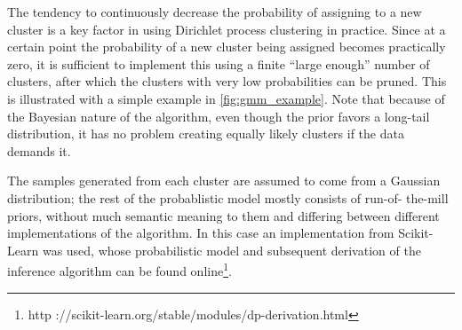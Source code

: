 The tendency to continuously decrease the probability of assigning to a new
cluster is a key factor in using Dirichlet process clustering in practice.
Since at a certain point the probability of a new cluster being assigned
becomes practically zero, it is sufficient to implement this using a finite
``large enough'' number of clusters, after which the clusters with very low
probabilities can be pruned. This is illustrated with a simple example in
\cref{fig:gmm_example}. Note that because of the Bayesian nature of the
algorithm, even though the prior favors a long-tail distribution, it has no
problem creating equally likely clusters if the data demands it.

The samples generated from each cluster are assumed to come from a Gaussian
distribution; the rest of the probablistic model mostly consists of run-of-
the-mill priors, without much semantic meaning to them and differing between
different implementations of the algorithm. In this case an implementation
from Scikit-Learn\cite{scikit-learn} was used, whose probabilistic model and
subsequent derivation of the inference algorithm can be found
online\footnote{http ://scikit-learn.org/stable/modules/dp-derivation.html}.

